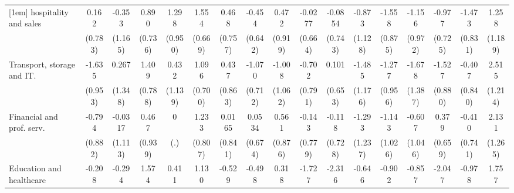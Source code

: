 {\begin{tabular}{l*{16}{c}}
[1em]
hospitality and sales&       0.162         &      -0.353         &       0.890         &       1.298         &       1.554\sym{*}  &       0.468         &      -0.454         &       0.472         &     -0.0277         &     -0.0854         &      -0.873         &      -1.558         &      -1.156         &      -0.977         &      -1.473         &       1.258         \\
                    &     (0.783)         &     (1.165)         &     (0.736)         &     (0.950)         &     (0.669)         &     (0.757)         &     (0.642)         &     (0.919)         &     (0.664)         &     (0.743)         &     (1.128)         &     (0.875)         &     (0.972)         &     (0.725)         &     (0.831)         &     (1.189)         \\
[1em]
Transport, storage and IT.&      -1.635         &       0.267         &       1.409         &       0.432         &       1.096         &       0.437         &      -1.070         &      -1.008         &      -0.702         &       0.101         &      -1.485         &      -1.277         &      -1.678         &      -1.527         &      -0.407         &       2.515\sym{*}  \\
                    &     (0.953)         &     (1.348)         &     (0.788)         &     (1.139)         &     (0.700)         &     (0.863)         &     (0.712)         &     (1.062)         &     (0.791)         &     (0.653)         &     (1.176)         &     (0.956)         &     (1.387)         &     (0.880)         &     (0.840)         &     (1.214)         \\
[1em]
Financial and prof. serv.&      -0.794         &     -0.0317         &       0.467         &           0         &       1.233         &      0.0165         &      0.0534         &       0.561         &      -0.143         &      -0.118         &      -1.293         &      -1.143         &      -0.607         &       0.379         &      -0.410         &       2.131         \\
                    &     (0.882)         &     (1.113)         &     (0.939)         &         (.)         &     (0.807)         &     (0.841)         &     (0.674)         &     (0.876)         &     (0.779)         &     (0.728)         &     (1.237)         &     (1.026)         &     (1.046)         &     (0.659)         &     (0.741)         &     (1.265)         \\
[1em]
Education and healthcare&      -0.208         &      -0.294         &       1.574\sym{*}  &       0.411         &       1.130         &      -0.529         &      -0.498         &       0.318         &      -1.727         &      -2.316\sym{*}  &      -0.646         &      -0.902         &      -0.857         &      -2.047         &      -0.978         &       1.757         \\

\end{tabular}}
